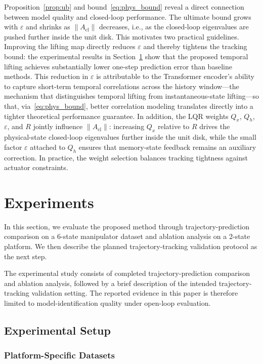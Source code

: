 \documentclass[journal]{IEEEtran}
\begin{document}
Proposition~\ref{prop:ub} and bound~\eqref{eq:phys_bound} reveal a direct connection between model quality and closed-loop performance. The ultimate bound grows with $\varepsilon$ and shrinks as $\|A_{\mathrm{cl}}\|$ decreases, i.e., as the closed-loop eigenvalues are pushed further inside the unit disk. This motivates two practical guidelines. Improving the lifting map directly reduces $\varepsilon$ and thereby tightens the tracking bound: the experimental results in Section~\ref{sec:experiments} show that the proposed temporal lifting achieves substantially lower one-step prediction error than baseline methods. This reduction in $\varepsilon$ is attributable to the Transformer encoder's ability to capture short-term temporal correlations across the history window---the mechanism that distinguishes temporal lifting from instantaneous-state lifting---so that, via~\eqref{eq:phys_bound}, better correlation modeling translates directly into a tighter theoretical performance guarantee. In addition, the LQR weights $Q_x$, $Q_h$, $\varepsilon$, and $R$ jointly influence $\|A_{\mathrm{cl}}\|$: increasing $Q_x$ relative to $R$ drives the physical-state closed-loop eigenvalues further inside the unit disk, while the small factor $\varepsilon$ attached to $Q_h$ ensures that memory-state feedback remains an auxiliary correction. In practice, the weight selection balances tracking tightness against actuator constraints.

\section{Experiments}
\label{sec:experiments}

In this section, we evaluate the proposed method through trajectory-prediction comparison on a 6-state manipulator dataset and ablation analysis on a 2-state platform. We then describe the planned trajectory-tracking validation protocol as the next step.

The experimental study consists of completed trajectory-prediction comparison and ablation analysis, followed by a brief description of the intended trajectory-tracking validation setting. The reported evidence in this paper is therefore limited to model-identification quality under open-loop evaluation.

\subsection{Experimental Setup}

\subsubsection{Platform-Specific Datasets}
\end{document}
